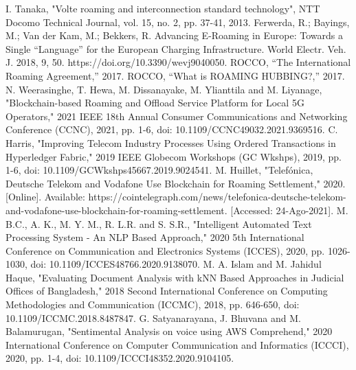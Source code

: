 \documentclass[conference]{style/IEEEtran}
\begin{document}
\begin{thebibliography}{00}
 I. Tanaka, "Volte roaming and interconnection standard technology", NTT Docomo Technical Journal, vol. 15, no. 2, pp. 37-41, 2013.
 Ferwerda, R.; Bayings, M.; Van der Kam, M.; Bekkers, R. Advancing E-Roaming in Europe: Towards a Single “Language” for the European Charging Infrastructure. World Electr. Veh. J. 2018, 9, 50. https://doi.org/10.3390/wevj9040050.
 ROCCO, “The International Roaming Agreement,” 2017.
 ROCCO, “What is ROAMING HUBBING?,” 2017.
 N. Weerasinghe, T. Hewa, M. Dissanayake, M. Ylianttila and M. Liyanage, "Blockchain-based Roaming and Offload Service Platform for Local 5G Operators," 2021 IEEE 18th Annual Consumer Communications and Networking Conference (CCNC), 2021, pp. 1-6, doi: 10.1109/CCNC49032.2021.9369516.
 C. Harris, "Improving Telecom Industry Processes Using Ordered Transactions in Hyperledger Fabric," 2019 IEEE Globecom Workshops (GC Wkshps), 2019, pp. 1-6, doi: 10.1109/GCWkshps45667.2019.9024541.
 M. Huillet, "Telefónica, Deutsche Telekom and Vodafone Use Blockchain for Roaming Settlement," 2020. [Online]. Available: https://cointelegraph.com/news/telefonica-deutsche-telekom-and-vodafone-use-blockchain-for-roaming-settlement. [Accessed: 24-Ago-2021].
 M. B.C., A. K., M. Y. M., R. L.R. and S. S.R., "Intelligent Automated Text Processing System - An NLP Based Approach," 2020 5th International Conference on Communication and Electronics Systems (ICCES), 2020, pp. 1026-1030, doi: 10.1109/ICCES48766.2020.9138070.
 M. A. Islam and M. Jahidul Haque, "Evaluating Document Analysis with kNN Based Approaches in Judicial Offices of Bangladesh," 2018 Second International Conference on Computing Methodologies and Communication (ICCMC), 2018, pp. 646-650, doi: 10.1109/ICCMC.2018.8487847.
 G. Satyanarayana, J. Bhuvana and M. Balamurugan, "Sentimental Analysis on voice using AWS Comprehend," 2020 International Conference on Computer Communication and Informatics (ICCCI), 2020, pp. 1-4, doi: 10.1109/ICCCI48352.2020.9104105.
\end{thebibliography}
\vspace{12pt}
\end{document}
